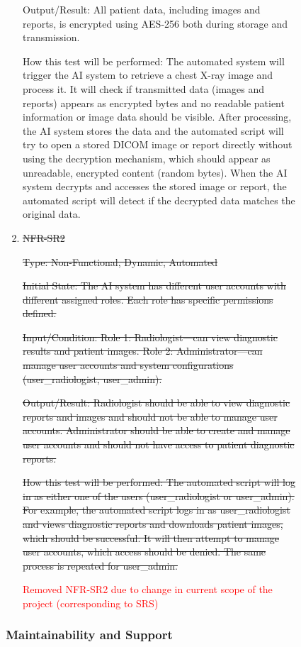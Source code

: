 \documentclass[12pt, titlepage]{article}
\begin{document}
\begin{enumerate}
\begin{enumerate}
\begin{enumerate}
\begin{enumerate}
\begin{enumerate}
Output/Result: All patient data, including images and reports, is encrypted using AES-256 both during storage and transmission.

How this test will be performed: The automated system will trigger the AI system to retrieve a chest X-ray image and process it. It will check if transmitted data (images and reports) appears as encrypted bytes and no readable patient information or image data should be visible. After processing, the AI system stores the data and the automated script will try to open a stored DICOM image or report directly without using the decryption mechanism, which should appear as unreadable, encrypted content (random bytes). When the AI system decrypts and accesses the stored image or report, the automated script will detect if the decrypted data matches the original data.

\item{\sout{NFR-SR2}\\}\label{NFR-SR2}

\sout{Type: Non-Functional, Dynamic, Automated}

\sout{Initial State: The AI system has different user accounts with different assigned roles. Each role has specific permissions defined.}

\sout{Input/Condition: Role 1: Radiologist—can view diagnostic results and patient images. Role 2: Administrator—can manage user accounts and system configurations (user\_radiologist, user\_admin).}

\sout{Output/Result: Radiologist should be able to view diagnostic reports and images and should not be able to manage user accounts. Administrator should be able to create and manage user accounts and should not have access to patient diagnostic reports.}

\sout{How this test will be performed: The automated script will log in as either one of the users (user\_radiologist or user\_admin). For example, the automated script logs in as user\_radiologist and views diagnostic reports and downloads patient images, which should be successful. It will then attempt to manage user accounts, which access should be denied. The same process is repeated for user\_admin.}

\textcolor{red}{Removed NFR-SR2 due to change in current scope of the project (corresponding to SRS)}

\end{enumerate}

\subsubsection{Maintainability and Support}


\end{enumerate}
\end{enumerate}
\end{enumerate}
\end{enumerate}
\end{document}
